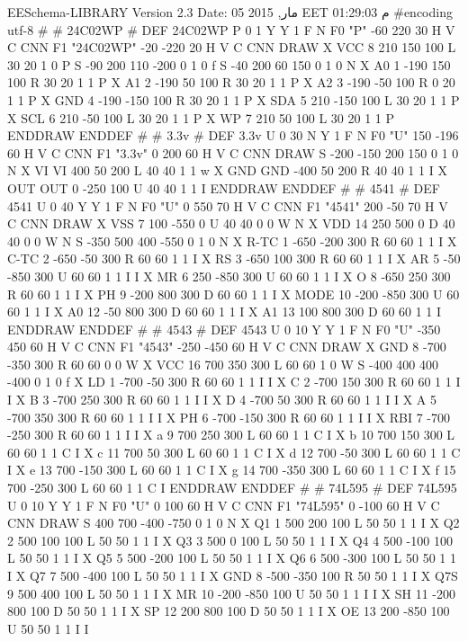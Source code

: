 EESchema-LIBRARY Version 2.3  Date: 05 مار, 2015 EET 01:29:03 م
#encoding utf-8
#
# 24C02WP
#
DEF 24C02WP P 0 1 Y Y 1 F N
F0 "P" -60 220 30 H V C CNN
F1 "24C02WP" -20 -220 20 H V C CNN
DRAW
X VCC 8 210 150 100 L 30 20 1 0 P
S -90 200 110 -200 0 1 0 f
S -40 200 60 150 0 1 0 N
X A0 1 -190 150 100 R 30 20 1 1 P
X A1 2 -190 50 100 R 30 20 1 1 P
X A2 3 -190 -50 100 R 0 20 1 1 P
X GND 4 -190 -150 100 R 30 20 1 1 P
X SDA 5 210 -150 100 L 30 20 1 1 P
X SCL 6 210 -50 100 L 30 20 1 1 P
X WP 7 210 50 100 L 30 20 1 1 P
ENDDRAW
ENDDEF
#
# 3.3v
#
DEF 3.3v U 0 30 N Y 1 F N
F0 "U" 150 -196 60 H V C CNN
F1 "3.3v" 0 200 60 H V C CNN
DRAW
S -200 -150 200 150 0 1 0 N
X VI VI 400 50 200 L 40 40 1 1 w
X GND GND -400 50 200 R 40 40 1 1 I
X OUT OUT 0 -250 100 U 40 40 1 1 I
ENDDRAW
ENDDEF
#
# 4541
#
DEF 4541 U 0 40 Y Y 1 F N
F0 "U" 0 550 70 H V C CNN
F1 "4541" 200 -50 70 H V C CNN
DRAW
X VSS 7 100 -550 0 U 40 40 0 0 W N
X VDD 14 250 500 0 D 40 40 0 0 W N
S -350 500 400 -550 0 1 0 N
X R-TC 1 -650 -200 300 R 60 60 1 1 I
X C-TC 2 -650 -50 300 R 60 60 1 1 I
X RS 3 -650 100 300 R 60 60 1 1 I
X AR 5 -50 -850 300 U 60 60 1 1 I I
X MR 6 250 -850 300 U 60 60 1 1 I
X O 8 -650 250 300 R 60 60 1 1 I
X PH 9 -200 800 300 D 60 60 1 1 I
X MODE 10 -200 -850 300 U 60 60 1 1 I
X A0 12 -50 800 300 D 60 60 1 1 I
X A1 13 100 800 300 D 60 60 1 1 I
ENDDRAW
ENDDEF
#
# 4543
#
DEF 4543 U 0 10 Y Y 1 F N
F0 "U" -350 450 60 H V C CNN
F1 "4543" -250 -450 60 H V C CNN
DRAW
X GND 8 -700 -350 300 R 60 60 0 0 W
X VCC 16 700 350 300 L 60 60 1 0 W
S -400 400 400 -400 0 1 0 f
X LD 1 -700 -50 300 R 60 60 1 1 I I
X C 2 -700 150 300 R 60 60 1 1 I I
X B 3 -700 250 300 R 60 60 1 1 I I
X D 4 -700 50 300 R 60 60 1 1 I I
X A 5 -700 350 300 R 60 60 1 1 I I
X PH 6 -700 -150 300 R 60 60 1 1 I I
X RBI 7 -700 -250 300 R 60 60 1 1 I I
X a 9 700 250 300 L 60 60 1 1 C I
X b 10 700 150 300 L 60 60 1 1 C I
X c 11 700 50 300 L 60 60 1 1 C I
X d 12 700 -50 300 L 60 60 1 1 C I
X e 13 700 -150 300 L 60 60 1 1 C I
X g 14 700 -350 300 L 60 60 1 1 C I
X f 15 700 -250 300 L 60 60 1 1 C I
ENDDRAW
ENDDEF
#
# 74L595
#
DEF 74L595 U 0 10 Y Y 1 F N
F0 "U" 0 100 60 H V C CNN
F1 "74L595" 0 -100 60 H V C CNN
DRAW
S 400 700 -400 -750 0 1 0 N
X Q1 1 500 200 100 L 50 50 1 1 I
X Q2 2 500 100 100 L 50 50 1 1 I
X Q3 3 500 0 100 L 50 50 1 1 I
X Q4 4 500 -100 100 L 50 50 1 1 I
X Q5 5 500 -200 100 L 50 50 1 1 I
X Q6 6 500 -300 100 L 50 50 1 1 I
X Q7 7 500 -400 100 L 50 50 1 1 I
X GND 8 -500 -350 100 R 50 50 1 1 I
X Q7S 9 500 400 100 L 50 50 1 1 I
X MR 10 -200 -850 100 U 50 50 1 1 I I
X SH 11 -200 800 100 D 50 50 1 1 I
X SP 12 200 800 100 D 50 50 1 1 I
X OE 13 200 -850 100 U 50 50 1 1 I I

